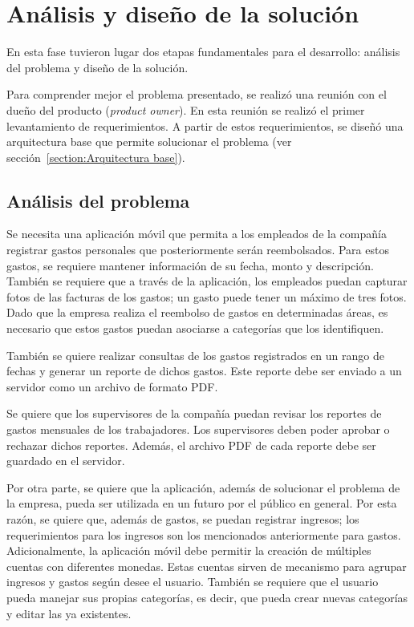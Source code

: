 \section{Análisis y diseño de la solución} \label{sect:Diseno}

En esta fase tuvieron lugar dos etapas fundamentales para el desarrollo: análisis del problema y diseño de la solución.

Para comprender mejor el problema presentado, se realizó una reunión con el dueño del producto (\textit{product owner}). En esta reunión se realizó el primer levantamiento de requerimientos. A partir de estos requerimientos, se diseñó una arquitectura base que permite solucionar el problema (ver sección~\ref{section:Arquitectura base}).

\subsection{Análisis del problema}

Se necesita una aplicación móvil que permita a los empleados de la compañía registrar gastos personales que posteriormente serán reembolsados. Para estos gastos, se requiere mantener información de su fecha, monto y descripción. También se requiere que a través de la aplicación, los empleados puedan capturar fotos de las facturas de los gastos; un gasto puede tener un máximo de tres fotos.
Dado que la empresa realiza el reembolso de gastos en determinadas áreas, es necesario que estos gastos puedan asociarse a categorías que los identifiquen.

También se quiere realizar consultas de los gastos registrados en un rango de fechas y generar un reporte de dichos gastos. Este reporte debe ser enviado a un servidor como un archivo de formato PDF.

Se quiere que los supervisores de la compañía puedan revisar los reportes de gastos mensuales de los trabajadores. Los supervisores deben poder aprobar o rechazar dichos reportes. Además, el archivo PDF de cada reporte debe ser guardado en el servidor.

Por otra parte, se quiere que la aplicación, además de solucionar el problema de la empresa, pueda ser utilizada en un futuro por el público en general. Por esta razón, se quiere que, además de gastos, se puedan registrar ingresos; los requerimientos para los ingresos son los mencionados anteriormente para gastos. Adicionalmente, la aplicación móvil debe permitir la creación de múltiples cuentas con diferentes monedas. Estas cuentas sirven de mecanismo para agrupar ingresos y gastos según desee el usuario. También se requiere que el usuario pueda manejar sus propias categorías, es decir, que pueda crear nuevas categorías y editar las ya existentes.

